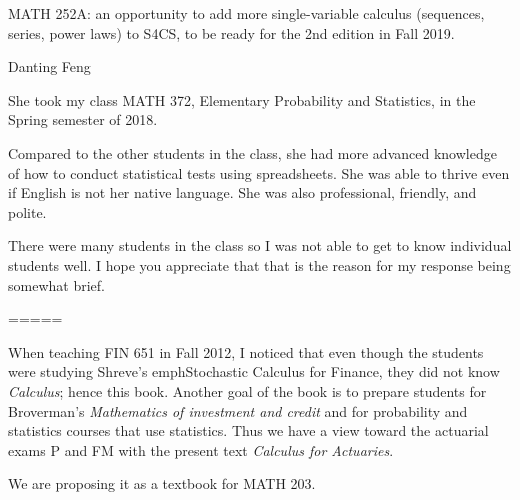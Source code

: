 

MATH 252A: an opportunity to add more single-variable calculus (sequences, series, power laws) to S4CS, to be ready for the 2nd edition in Fall 2019.











Danting Feng

She took my class MATH 372, Elementary Probability and Statistics, in the Spring semester of 2018.

Compared to the other students in the class, she had more advanced knowledge of how to conduct statistical tests using spreadsheets. She was able to thrive even if English is not her native language. She was also professional, friendly, and polite.

There were many students in the class so I was not able to get to know individual students well. I hope you appreciate that that is the reason for my response being somewhat brief.



=====

When teaching FIN 651 in Fall 2012, I noticed that even though the students were studying Shreve's emph{Stochastic Calculus for Finance},
they did not know \emph{Calculus}; hence this book.
Another goal of the book is to prepare students for Broverman's \emph{Mathematics of investment and credit} and for probability and statistics courses that use statistics. Thus we have a view toward the actuarial exams P and FM with the present text \emph{Calculus for Actuaries}.

We are proposing it as a textbook for MATH 203.
